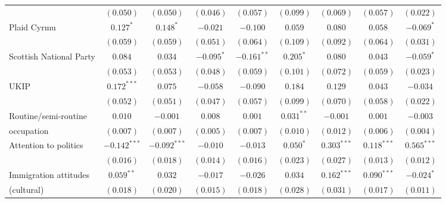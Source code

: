 \documentclass[12pt, letter]{article}
\begin{document}
\begin{table}[H]
\begin{center}
{\begin{tabular}{l c c c c c c c c }
                                 & $(0.050)$      & $(0.050)$      & $(0.046)$      & $(0.057)$      & $(0.099)$      & $(0.069)$      & $(0.057)$      & $(0.022)$      \\
Plaid Cyrmu                      & $0.127^{*}$    & $0.148^{*}$    & $-0.021$       & $-0.100$       & $0.059$        & $0.080$        & $0.058$        & $-0.069^{*}$   \\
                                 & $(0.059)$      & $(0.059)$      & $(0.051)$      & $(0.064)$      & $(0.109)$      & $(0.092)$      & $(0.064)$      & $(0.031)$      \\
Scottish National Party          & $0.084$        & $0.034$        & $-0.095^{*}$   & $-0.161^{**}$  & $0.205^{*}$    & $0.080$        & $0.043$        & $-0.059^{*}$   \\
                                 & $(0.053)$      & $(0.053)$      & $(0.048)$      & $(0.059)$      & $(0.101)$      & $(0.072)$      & $(0.059)$      & $(0.023)$      \\
UKIP                             & $0.172^{***}$  & $0.075$        & $-0.058$       & $-0.090$       & $0.184$        & $0.129$        & $0.043$        & $-0.034$       \\
                                 & $(0.052)$      & $(0.051)$      & $(0.047)$      & $(0.057)$      & $(0.099)$      & $(0.070)$      & $(0.058)$      & $(0.022)$      \\
Routine/semi-routine   & $0.010$        & $-0.001$       & $0.008$        & $0.001$        & $0.031^{**}$   & $-0.001$       & $0.001$        & $-0.003$       \\
occupation                                 & $(0.007)$      & $(0.007)$      & $(0.005)$      & $(0.007)$      & $(0.010)$      & $(0.012)$      & $(0.006)$      & $(0.004)$      \\
Attention to politics            & $-0.142^{***}$ & $-0.092^{***}$ & $-0.010$       & $-0.013$       & $0.050^{*}$    & $0.303^{***}$  & $0.118^{***}$  & $0.565^{***}$  \\
                                 & $(0.016)$      & $(0.018)$      & $(0.014)$      & $(0.016)$      & $(0.023)$      & $(0.027)$      & $(0.013)$      & $(0.012)$      \\
Immigration attitudes  & $0.059^{**}$   & $0.032$        & $-0.017$       & $-0.026$       & $0.034$        & $0.162^{***}$  & $0.090^{***}$  & $-0.024^{*}$   \\
(cultural)                                 & $(0.018)$      & $(0.020)$      & $(0.015)$      & $(0.018)$      & $(0.028)$      & $(0.031)$      & $(0.017)$      & $(0.011)$      \\

\end{tabular}}
\end{center}
\end{table}
\end{document}
